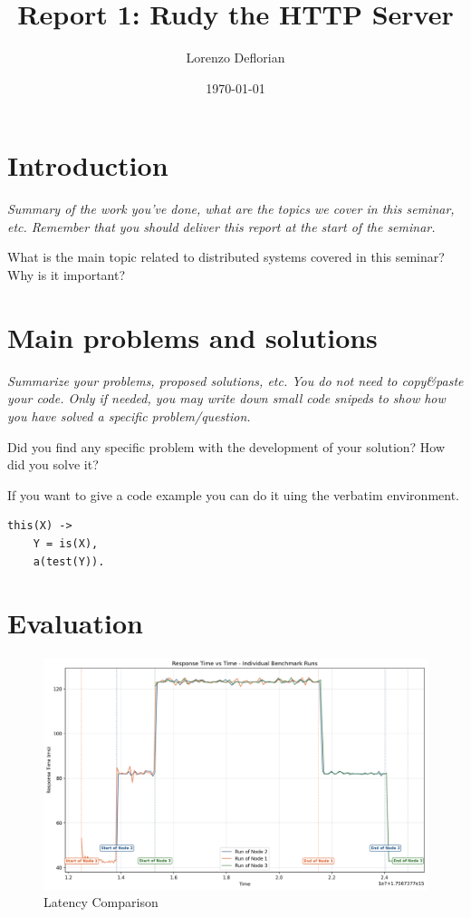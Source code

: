 \documentclass[a4paper, 11pt]{article}
\title{Report 1: Rudy the HTTP Server}
\author{Lorenzo Deflorian}
\date{\today{}}
\begin{document}
\maketitle

\section{Introduction}

\textit{Summary of the work you've done, what are the topics we cover
  in this seminar, etc. Remember that you should deliver this report
  at the start of the seminar.}

What is the main topic related to distributed systems covered in this seminar?
Why is it important?

\section{Main problems and solutions}

\textit{Summarize your problems, proposed solutions, etc. You do not
  need to copy\&paste your code. Only if needed, you may write down
  small code snipeds to show how you have solved a specific
  problem/question.}

Did you find any specific problem with the development of your
solution?  How did you solve it?

If you want to give a code example you can do it uing the verbatim environment.
\begin{verbatim}
this(X) ->
    Y = is(X),
    a(test(Y)).
\end{verbatim}

\section{Evaluation}

\begin{figure}
  \begin{center}
    \includegraphics{latency_plot.png}
    \caption{Latency Comparison}
    \label{fig:latency_comparison}
  \end{center}
\end{figure}
\end{document}
